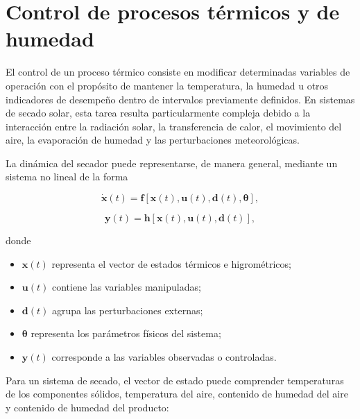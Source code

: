 
\section{Control de procesos térmicos y de humedad}
\label{sec:control_termohigrometrico}

El control de un proceso térmico consiste en modificar determinadas variables de operación con el propósito de mantener la temperatura, la humedad u otros indicadores de desempeño dentro de intervalos previamente definidos. En sistemas de secado solar, esta tarea resulta particularmente compleja debido a la interacción entre la radiación solar, la transferencia de calor, el movimiento del aire, la evaporación de humedad y las perturbaciones meteorológicas.

La dinámica del secador puede representarse, de manera general, mediante un sistema no lineal de la forma

\begin{equation}
\dot{\mathbf{x}}(t)
=
\mathbf{f}
\left[
\mathbf{x}(t),
\mathbf{u}(t),
\mathbf{d}(t),
\boldsymbol{\theta}
\right],
\label{eq:modelo_general_control}
\end{equation}

\begin{equation}
\mathbf{y}(t)
=
\mathbf{h}
\left[
\mathbf{x}(t),
\mathbf{u}(t),
\mathbf{d}(t)
\right],
\label{eq:modelo_salida_control}
\end{equation}

donde

\begin{itemize}
    \item $\mathbf{x}(t)$ representa el vector de estados térmicos e higrométricos;
    \item $\mathbf{u}(t)$ contiene las variables manipuladas;
    \item $\mathbf{d}(t)$ agrupa las perturbaciones externas;
    \item $\boldsymbol{\theta}$ representa los parámetros físicos del sistema;
    \item $\mathbf{y}(t)$ corresponde a las variables observadas o controladas.
\end{itemize}

Para un sistema de secado, el vector de estado puede comprender temperaturas de los componentes sólidos, temperatura del aire, contenido de humedad del aire y contenido de humedad del producto:

